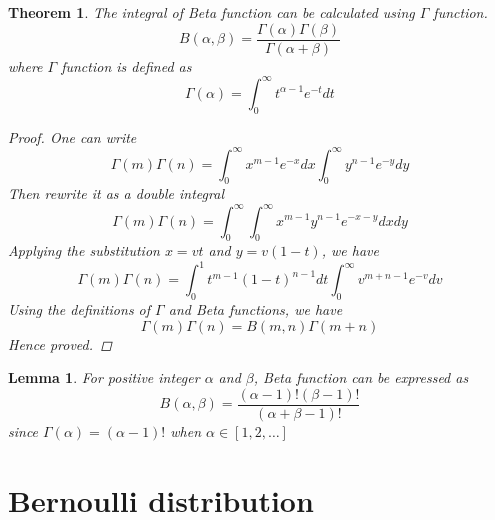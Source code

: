 \documentclass[a4paper]{article}
\newtheorem{theorem}{Theorem}[section]
\newtheorem{lemma}{Lemma}[section]
\begin{document}
\begin{theorem}
    The integral of Beta function can be calculated using $\Gamma$ function.
    \begin{equation}
        B(\alpha, \beta) = \frac{\Gamma(\alpha)\Gamma(\beta)}{\Gamma(\alpha+\beta)}
    \end{equation}
    where $\Gamma$ function is defined as
    \begin{equation}
        \Gamma(\alpha) = \int_{0}^{\infty} t^{\alpha-1} e^{-t} dt
        \label{eq: Gamma function}
    \end{equation}

    \begin{proof}
        One can write
        \begin{equation*}
            \Gamma(m)\Gamma(n) = \int_{0}^{\infty} x^{m-1} e^{-x} dx \int_{0}^{\infty} y^{n-1} e^{-y} dy
        \end{equation*}
        Then rewrite it as a double integral
        \begin{equation*}
            \Gamma(m)\Gamma(n) = \int_{0}^{\infty} \int_{0}^{\infty} x^{m-1} y^{n-1} e^{-x-y} dx dy
        \end{equation*}
        Applying the substitution $x=vt$ and $y=v(1-t)$, we have
        \begin{equation*}
            \Gamma(m)\Gamma(n) = \int_{0}^{1} t^{m-1} (1-t)^{n-1} dt \int_{0}^{\infty} v^{m+n-1} e^{-v} dv
        \end{equation*}
        Using the definitions of $\Gamma$ and Beta functions, we have
        \begin{equation*}
            \Gamma(m)\Gamma(n) = B(m, n) \Gamma(m+n)
        \end{equation*}
        Hence proved.
    \end{proof}
\end{theorem}

\begin{lemma}
    For positive integer $\alpha$ and $\beta$, Beta function can be expressed as
    \begin{equation}
        B(\alpha, \beta) = \frac{(\alpha-1)!(\beta-1)!}{(\alpha+\beta-1)!}
    \end{equation}
    since $\Gamma(\alpha) = (\alpha-1)!$ when $\alpha \in [1, 2, \ldots]$
\end{lemma}

\section{Bernoulli distribution}
\end{document}
